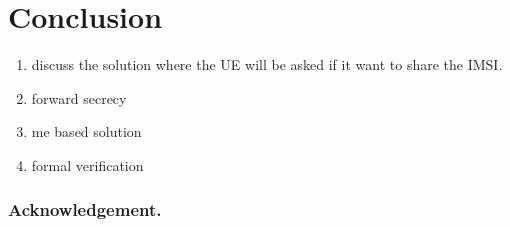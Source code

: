 \documentclass{llncs} %
\begin{document}
\section{Conclusion}
\label{sec:conclusion}
\begin{enumerate}
 \item discuss the solution where the UE will be asked if it want to share the IMSI.
 \item forward secrecy
 \item me based solution
 \item formal verification
\end{enumerate}

\subsubsection{Acknowledgement.}
\label{sec:acknowledgement}



{}

\begin{thebibliography}{5}



\end{thebibliography}
\end{document}
